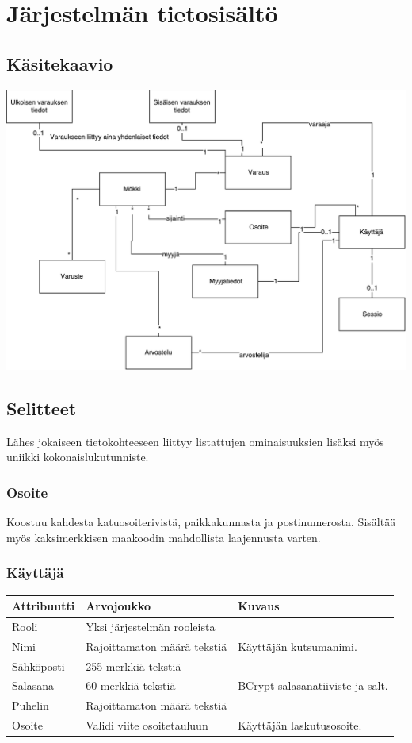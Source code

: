 \chapter{Järjestelmän tietosisältö}
\section{Käsitekaavio}

\includegraphics[width = 14cm]{./diagrams/drawio_entities.pdf}
\newpage
\section{Selitteet}
Lähes jokaiseen tietokohteeseen liittyy listattujen ominaisuuksien lisäksi myös uniikki kokonaislukutunniste.

\subsection{Osoite}
Koostuu kahdesta katuosoiterivistä, paikkakunnasta ja postinumerosta. Sisältää myös kaksimerkkisen maakoodin mahdollista laajennusta varten.

\subsection{Käyttäjä}
\begin{tabular}{| l | p{4cm} | p{5cm} |}
	\hline
	Attribuutti & Arvojoukko & Kuvaus \\ \hline
	Rooli & Yksi järjestelmän rooleista & \\ \hline
	Nimi & Rajoittamaton määrä tekstiä & Käyttäjän kutsumanimi. \\ \hline
	Sähköposti & 255 merkkiä tekstiä & \\ \hline
	Salasana & 60 merkkiä tekstiä & BCrypt-salasanatiiviste ja salt. \\ \hline
	Puhelin & Rajoittamaton määrä tekstiä & \\ \hline
	Osoite & Validi viite osoitetauluun & Käyttäjän laskutusosoite. \\ \hline
\end{tabular}

